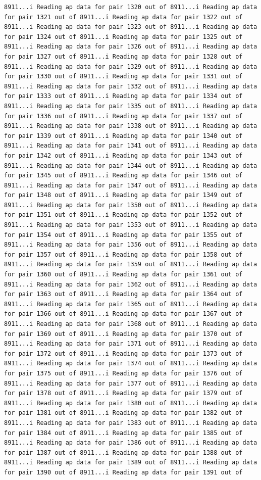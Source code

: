 \documentclass[
]{article}
\begin{document}
\begin{verbatim}
8911...i Reading ap data for pair 1320 out of 8911...i Reading ap data for pair 1321 out of 8911...i Reading ap data for pair 1322 out of 8911...i Reading ap data for pair 1323 out of 8911...i Reading ap data for pair 1324 out of 8911...i Reading ap data for pair 1325 out of 8911...i Reading ap data for pair 1326 out of 8911...i Reading ap data for pair 1327 out of 8911...i Reading ap data for pair 1328 out of 8911...i Reading ap data for pair 1329 out of 8911...i Reading ap data for pair 1330 out of 8911...i Reading ap data for pair 1331 out of 8911...i Reading ap data for pair 1332 out of 8911...i Reading ap data for pair 1333 out of 8911...i Reading ap data for pair 1334 out of 8911...i Reading ap data for pair 1335 out of 8911...i Reading ap data for pair 1336 out of 8911...i Reading ap data for pair 1337 out of 8911...i Reading ap data for pair 1338 out of 8911...i Reading ap data for pair 1339 out of 8911...i Reading ap data for pair 1340 out of 8911...i Reading ap data for pair 1341 out of 8911...i Reading ap data for pair 1342 out of 8911...i Reading ap data for pair 1343 out of 8911...i Reading ap data for pair 1344 out of 8911...i Reading ap data for pair 1345 out of 8911...i Reading ap data for pair 1346 out of 8911...i Reading ap data for pair 1347 out of 8911...i Reading ap data for pair 1348 out of 8911...i Reading ap data for pair 1349 out of 8911...i Reading ap data for pair 1350 out of 8911...i Reading ap data for pair 1351 out of 8911...i Reading ap data for pair 1352 out of 8911...i Reading ap data for pair 1353 out of 8911...i Reading ap data for pair 1354 out of 8911...i Reading ap data for pair 1355 out of 8911...i Reading ap data for pair 1356 out of 8911...i Reading ap data for pair 1357 out of 8911...i Reading ap data for pair 1358 out of 8911...i Reading ap data for pair 1359 out of 8911...i Reading ap data for pair 1360 out of 8911...i Reading ap data for pair 1361 out of 8911...i Reading ap data for pair 1362 out of 8911...i Reading ap data for pair 1363 out of 8911...i Reading ap data for pair 1364 out of 8911...i Reading ap data for pair 1365 out of 8911...i Reading ap data for pair 1366 out of 8911...i Reading ap data for pair 1367 out of 8911...i Reading ap data for pair 1368 out of 8911...i Reading ap data for pair 1369 out of 8911...i Reading ap data for pair 1370 out of 8911...i Reading ap data for pair 1371 out of 8911...i Reading ap data for pair 1372 out of 8911...i Reading ap data for pair 1373 out of 8911...i Reading ap data for pair 1374 out of 8911...i Reading ap data for pair 1375 out of 8911...i Reading ap data for pair 1376 out of 8911...i Reading ap data for pair 1377 out of 8911...i Reading ap data for pair 1378 out of 8911...i Reading ap data for pair 1379 out of 8911...i Reading ap data for pair 1380 out of 8911...i Reading ap data for pair 1381 out of 8911...i Reading ap data for pair 1382 out of 8911...i Reading ap data for pair 1383 out of 8911...i Reading ap data for pair 1384 out of 8911...i Reading ap data for pair 1385 out of 8911...i Reading ap data for pair 1386 out of 8911...i Reading ap data for pair 1387 out of 8911...i Reading ap data for pair 1388 out of 8911...i Reading ap data for pair 1389 out of 8911...i Reading ap data for pair 1390 out of 8911...i Reading ap data for pair 1391 out of 
\end{verbatim}
\end{document}
